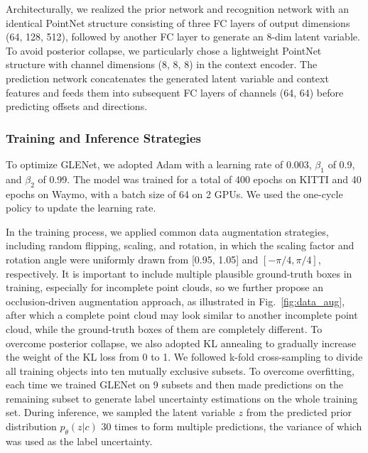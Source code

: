 \documentclass[twocolumn]{svjour3}
\begin{document}
Architecturally, we realized the prior network and recognition network with an identical PointNet structure consisting of three FC layers of output dimensions (64, 128, 512), followed by another FC layer to generate an 8-dim latent variable. To avoid posterior collapse, we particularly chose a lightweight PointNet structure with channel dimensions (8, 8, 8) in the context encoder. The prediction network concatenates the generated latent variable and context features and feeds them into subsequent FC layers of channels (64, 64) before predicting offsets and directions.


\subsubsection{Training and Inference Strategies} 
To optimize GLENet, we adopted Adam \citep{kingma2014adam} with a learning rate of 0.003, $\beta_1$ of 0.9, and $\beta_2$ of 0.99. The model was trained for a total of 400 epochs on KITTI and 40 epochs on Waymo, with a batch size of 64 on 2 GPUs. We used the one-cycle policy \citep{smith2017cyclical} to update the learning rate.

In the training process, we applied common data augmentation strategies, including random flipping, scaling, and rotation, in which the scaling factor and rotation angle were uniformly drawn from [0.95, 1.05] and $[-\pi/4, \pi/4]$, respectively. It is important to include multiple plausible ground-truth boxes in training, especially for incomplete point clouds, so we further propose an occlusion-driven augmentation approach, as illustrated in Fig.~\ref{fig:data_aug}, after which a complete point cloud may look similar to another incomplete point cloud, while the ground-truth boxes of them are completely different. To overcome posterior collapse, we also adopted KL annealing \citep{bowman2016generating} to gradually increase the weight of the KL loss from 0 to 1. We followed k-fold cross-sampling to divide all training objects into ten mutually exclusive subsets. To overcome overfitting, each time we trained GLENet on 9 subsets and then made predictions on the remaining subset to generate label uncertainty estimations on the whole training set. During inference, we sampled the latent variable $z$ from the predicted prior distribution $p_{\theta}(z \vert c)$ 30 times to form multiple predictions, the variance of which was used as the label uncertainty.
\end{document}
